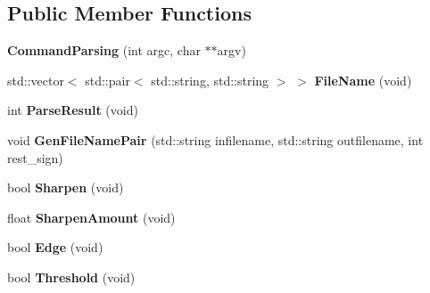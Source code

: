 \subsection*{Public Member Functions}
\begin{DoxyCompactItemize}
\item 
{\bfseries Command\+Parsing} (int argc, char $\ast$$\ast$argv)\hypertarget{classimage__tools_1_1CommandParsing_a77fe053e24453b75c873913f32c08e3b}{}\label{classimage__tools_1_1CommandParsing_a77fe053e24453b75c873913f32c08e3b}

\item 
std\+::vector$<$ std\+::pair$<$ std\+::string, std\+::string $>$ $>$ {\bfseries File\+Name} (void)\hypertarget{classimage__tools_1_1CommandParsing_a27e0e71f3041fe480746667a0f68498a}{}\label{classimage__tools_1_1CommandParsing_a27e0e71f3041fe480746667a0f68498a}

\item 
int {\bfseries Parse\+Result} (void)\hypertarget{classimage__tools_1_1CommandParsing_a8ac30786bddf4cb19c3e0a1559c704d3}{}\label{classimage__tools_1_1CommandParsing_a8ac30786bddf4cb19c3e0a1559c704d3}

\item 
void {\bfseries Gen\+File\+Name\+Pair} (std\+::string infilename, std\+::string outfilename, int rest\+\_\+sign)\hypertarget{classimage__tools_1_1CommandParsing_a72ecf4c2676aa1caa47bb74de4ec79d4}{}\label{classimage__tools_1_1CommandParsing_a72ecf4c2676aa1caa47bb74de4ec79d4}

\item 
bool {\bfseries Sharpen} (void)\hypertarget{classimage__tools_1_1CommandParsing_a3395908d370641e5d634d9aa55fa9ffb}{}\label{classimage__tools_1_1CommandParsing_a3395908d370641e5d634d9aa55fa9ffb}

\item 
float {\bfseries Sharpen\+Amount} (void)\hypertarget{classimage__tools_1_1CommandParsing_a410c2e6510fed93963cfcd029612d7e5}{}\label{classimage__tools_1_1CommandParsing_a410c2e6510fed93963cfcd029612d7e5}

\item 
bool {\bfseries Edge} (void)\hypertarget{classimage__tools_1_1CommandParsing_a1f9d71775216668f4ba22d782c9228aa}{}\label{classimage__tools_1_1CommandParsing_a1f9d71775216668f4ba22d782c9228aa}

\item 
bool {\bfseries Threshold} (void)\hypertarget{classimage__tools_1_1CommandParsing_a835bbd248854a4386527a511202b87ae}{}\label{classimage__tools_1_1CommandParsing_a835bbd248854a4386527a511202b87ae}


\end{DoxyCompactItemize}
